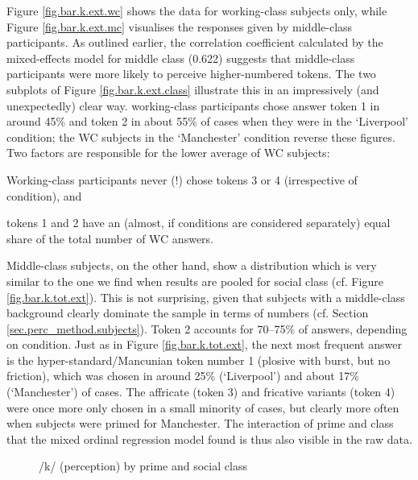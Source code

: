 Figure \ref{fig.bar.k.ext.wc} shows the data for working-class subjects only, while Figure \ref{fig.bar.k.ext.mc} visualises the responses given by middle-class participants.
As outlined earlier, the correlation coefficient calculated by the mixed-effects model for middle class (0.622) suggests that middle-class participants were more likely to perceive higher-numbered tokens.
The two subplots of Figure \ref{fig.bar.k.ext.class} illustrate this in an impressively (and unexpectedly) clear way.
working-class participants chose answer token 1 in around 45\% and token 2 in about 55\% of cases when they were in the `Liverpool' condition; the WC subjects in the `Manchester' condition reverse these figures.
Two factors are responsible for the lower average of WC subjects:
\begin{inparaenum}[(a)]
	\item Working-class participants never (!) chose tokens 3 or 4 (irrespective of  condition), and
	\item tokens 1 and 2 have an (almost, if conditions are considered separately) equal share of the total number of WC answers.
\end{inparaenum} 

Middle-class subjects, on the other hand, show a distribution which is very similar to the one we find when results are pooled for social class (cf. Figure \ref{fig.bar.k.tot.ext}).
This is not surprising, given that subjects with a middle-class background clearly dominate the sample in terms of numbers (cf. Section \ref{sec.perc_method.subjects}).
Token 2 accounts for 70--75\% of answers, depending on  condition.
Just as in Figure \ref{fig.bar.k.tot.ext}, the next most frequent answer is the hyper-standard/Mancunian token number 1 (plosive with burst, but no friction), which was chosen in around 25\% (`Liverpool') and about 17\% (`Manchester') of cases.
The affricate (token 3) and fricative variants (token 4) were once more only chosen in a small minority of cases, but clearly more often when subjects were primed for Manchester.
The interaction of prime and class that the mixed ordinal regression model found is thus also visible in the raw data.

\begin{figure}[h]
	\centering
		\resizebox{.49\linewidth}{!}{} 
	\caption{/k/ (perception) by prime and social class}
	\label{fig.scatter.k.ext.classprime}
\end{figure}

